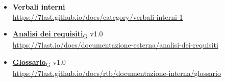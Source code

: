 \begin{itemize}
    \item \textbf{Verbali interni} \\
        \url{https://7last.github.io/docs/category/verbali-interni-1}
    \item \href{https://7last.github.io/docs/rtb/documentazione-interna/glossario\#analisi-dei-requisiti}{\textbf{Analisi dei requisiti}\textsubscript{G}} v1.0\\
        \url{https://7last.io/docs/documentazione-esterna/analisi-dei-requisiti}
    \item \href{https://7last.github.io/docs/rtb/documentazione-interna/glossario\#glossario}{\textbf{Glossario}\textsubscript{G}} v1.0\\
        \url{https://7last.github.io/docs/rtb/documentazione-interna/glossario}
\end{itemize}